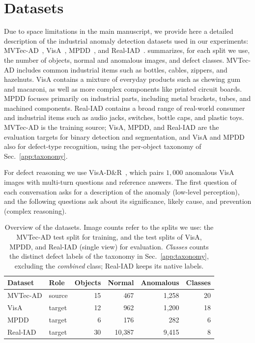 \appendix

\section{Datasets}
\label{app:datasets}
Due to space limitations in the main manuscript, we provide here a detailed description of the industrial anomaly detection datasets used in our experiments: MVTec-AD~\cite{Bergmann_2019_CVPR}, VisA~\cite{VisA}, MPDD~\cite{mpdd}, and Real-IAD~\cite{wang2024realiadrealworldmultiviewdataset}.  summarizes, for each split we use, the number of objects, normal and anomalous images, and defect classes.
MVTec-AD includes common industrial items such as bottles, cables, zippers, and hazelnuts. VisA contains a mixture of everyday products such as chewing gum and macaroni, as well as more complex components like printed circuit boards. MPDD focuses primarily on industrial parts, including metal brackets, tubes, and machined components. Real-IAD contains a broad range of real-world consumer and industrial items such as audio jacks, switches, bottle caps, and plastic toys. MVTec-AD is the training source; VisA, MPDD, and Real-IAD are the evaluation targets for binary detection and segmentation, and VisA and MPDD also for defect-type recognition, using the per-object taxonomy of Sec.~\ref{app:taxonomy}.

For defect reasoning we use VisA-D\&R~\cite{xu2025towards}, which pairs $1{,}000$ anomalous VisA images with multi-turn questions and reference answers. The first question of each conversation asks for a description of the anomaly (low-level perception), and the following questions ask about its significance, likely cause, and prevention (complex reasoning).

\begin{table}[t]
\centering
\footnotesize
\setlength{\tabcolsep}{4pt}
\caption[Overview of the datasets.]{Overview of the datasets. Image counts refer to the splits we use: the MVTec-AD test split for training, and the test splits of VisA, MPDD, and Real-IAD (single view) for evaluation. \emph{Classes} counts the distinct defect labels of the taxonomy in Sec.~\ref{app:taxonomy}, excluding the \emph{combined} class; Real-IAD keeps its native labels.}
\label{tab:dataset_summary}
\begin{tabular}{@{}llrrrr@{}}
\toprule
\textbf{Dataset} & \textbf{Role} & \textbf{Objects} & \textbf{Normal} & \textbf{Anomalous} & \textbf{Classes} \\
\midrule
MVTec-AD  & source & 15 & 467      & 1{,}258 & 20 \\
VisA      & target & 12 & 962      & 1{,}200 & 18 \\
MPDD      & target & 6  & 176      & 282     & 6  \\
Real-IAD  & target & 30 & 10{,}387 & 9{,}415 & 8  \\
\bottomrule
\end{tabular}
\end{table}

